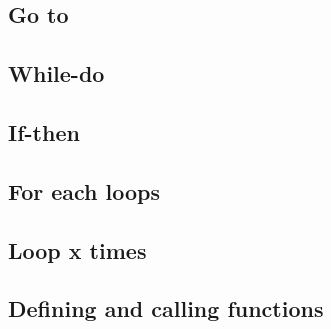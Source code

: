 
\subsection{Go to}

\subsection{While-do}

\subsection{If-then}

\subsection{For each loops}

\subsection{Loop x times}

\subsection{Defining and calling functions}


